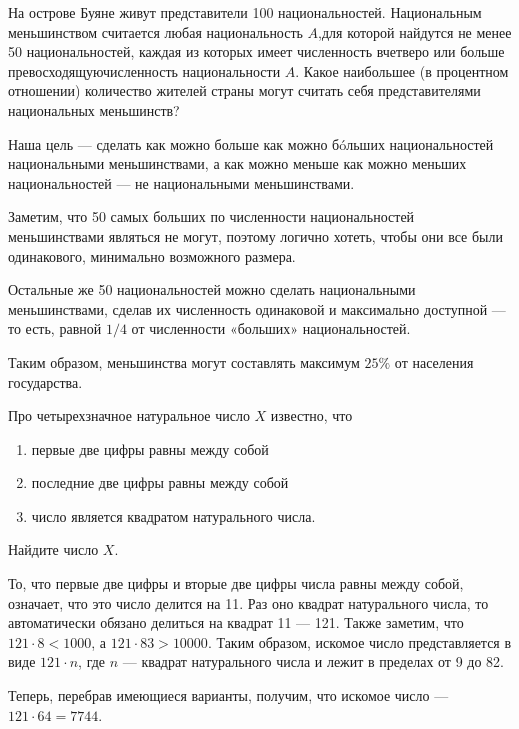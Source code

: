 
\begin{itemize}

	\itB На острове Буяне живут представители 100 национальностей. Национальным меньшинством считается любая национальность $A$,\linebreak для которой найдутся не менее 50 национальностей, каждая из которых имеет численность вчетверо или больше превосходящую\linebreak численность национальности $A$. Какое наибольшее (в процентном отношении) количество жителей страны могут считать себя представителями национальных меньшинств?
	
	\itr Наша цель — сделать как можно больше как можно б\'oльших национальностей национальными меньшинствами, а как можно меньше как можно меньших национальностей — не национальными меньшинствами.
	
	Заметим, что 50 самых больших по численности национальностей меньшинствами являться не могут, поэтому логично хотеть, чтобы они все были одинакового, минимально возможного размера.
	
	Остальные же 50 национальностей можно сделать национальными меньшинствами, сделав их численность одинаковой и максимально доступной — то есть, равной $1/4$ от численности «больших» национальностей.
	
	Таким образом, меньшинства могут составлять максимум $25\%$ от населения государства.

	\itC Про четырехзначное натуральное число $X$ известно, что
	
	\begin{enumerate}[label=\arabic*)]
		\item первые две цифры равны между собой\scolon
		\item последние две цифры равны между собой\scolon
		\item число является квадратом натурального числа.
	\end{enumerate}
	
	Найдите число $X$.
	
	\itr То, что первые две цифры и вторые две цифры числа равны между собой, означает, что это число делится на 11. Раз оно квадрат натурального числа, то автоматически обязано делиться на квадрат 11 — 121. Также заметим, что $121 \cdot 8 < 1000$, а $121 \cdot 83 > 10000$. Таким образом, искомое число представляется в виде $121 \cdot n$, где $n$ — квадрат натурального числа и лежит в пределах от 9 до 82.
	
	Теперь, перебрав имеющиеся варианты, получим, что искомое число — $121 \cdot 64 = 7744$.
	
\end{itemize}